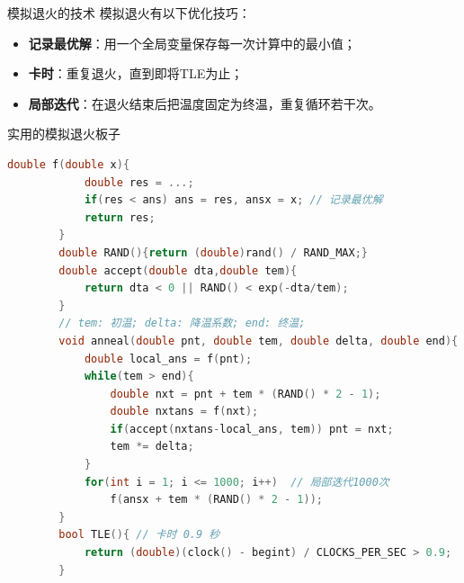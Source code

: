 \documentclass{beamer}
\begin{document}
\begin{frame}{模拟退火的技术}
    \small
    模拟退火有以下优化技巧：
    \begin{itemize}
        \item \textbf{记录最优解}：用一个全局变量保存每一次计算中的最小值；
        \item \textbf{卡时}：重复退火，直到即将TLE为止；
        \item \textbf{局部迭代}：在退火结束后把温度固定为终温，重复循环若干次。
    \end{itemize}
\end{frame}

\begin{frame}[fragile]{实用的模拟退火板子}
    \footnotesize
    \begin{lstlisting}[language=c++]
        double f(double x){
            double res = ...;
            if(res < ans) ans = res, ansx = x; // 记录最优解
            return res;
        }
        double RAND(){return (double)rand() / RAND_MAX;}
        double accept(double dta,double tem){
            return dta < 0 || RAND() < exp(-dta/tem);
        }
        // tem: 初温; delta: 降温系数; end: 终温;
        void anneal(double pnt, double tem, double delta, double end){
            double local_ans = f(pnt);
            while(tem > end){
                double nxt = pnt + tem * (RAND() * 2 - 1);
                double nxtans = f(nxt);
                if(accept(nxtans-local_ans, tem)) pnt = nxt;
                tem *= delta;
            }
            for(int i = 1; i <= 1000; i++)  // 局部迭代1000次
                f(ansx + tem * (RAND() * 2 - 1));
        }
        bool TLE(){ // 卡时 0.9 秒
            return (double)(clock() - begint) / CLOCKS_PER_SEC > 0.9;
        }
    \end{lstlisting}
\end{frame}
\end{document}

